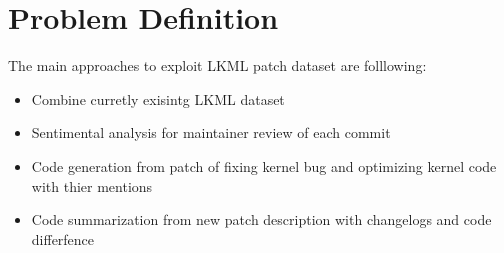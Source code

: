 \section{Problem Definition}
The main approaches to exploit LKML patch dataset are folllowing:
\begin{itemize}
\item Combine curretly exisintg LKML dataset ~\cite{miasoedov2017lkmlarchive,
	xu2018kernelpatchwork}
\item Sentimental analysis for maintainer review of each commit
\item Code generation from patch of fixing kernel bug and optimizing kernel code with
	thier mentions
\item Code summarization from new patch description with changelogs and code
	differfence
\end{itemize}
